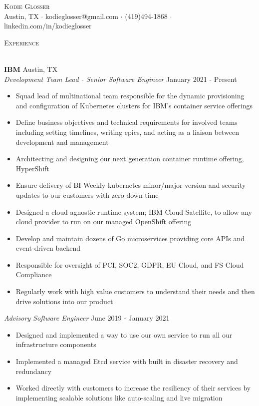 \documentclass[a4paper]{article}
\newcommand{\lineunder} {
    \vspace*{-8pt} \\
    \hspace*{-18pt} \hrulefill \\
}
\newcommand{\header} [1] {
    {\hspace*{-18pt}\vspace*{6pt} \textsc{#1}}
    \vspace*{-6pt} \lineunder
}
\begin{document}
\vspace*{-40pt}



\vspace*{-10pt}
\begin{center}
	{\Huge \scshape {Kodie Glosser}}\\
	Austin, TX $\cdot$ kodieglosser@gmail.com $\cdot$ (419)494-1868 $\cdot$ linkedin.com/in/kodieglosser\\
\end{center}

\header{Experience}
\vspace{1mm}

\textbf{IBM} \hfill Austin, TX\\
\textit{Development Team Lead - Senior Software Engineer} \hfill January 2021 - Present\\
\vspace{-1mm}
\begin{itemize} \itemsep 1pt
	\item Squad lead of multinational team responsible for the dynamic provisioning and configuration of Kubernetes clusters for IBM’s container service offerings
	\item Define business objectives and technical requirements for involved teams including setting timelines, writing epics, and acting as a liaison between development and management
	\item Architecting and designing our next generation container runtime offering, HyperShift
	\item Ensure delivery of BI-Weekly kubernetes minor/major version and security updates to our customers with zero down time
	\item Designed a cloud agnostic runtime system; IBM Cloud Satellite, to allow any cloud provider to run on our managed OpenShift offering
	\item Develop and maintain dozens of Go microservices providing core APIs and event-driven backend
	\item Responsible for oversight of PCI, SOC2, GDPR, EU Cloud, and FS Cloud Compliance
	\item Regularly work with high value customers to understand their needs and then drive solutions into our product
\end{itemize}
\textit{Advisory Software Engineer} \hfill June 2019 - January 2021\\
\vspace{-1mm}
\begin{itemize} \itemsep 1pt
	\item Designed and implemented a way to use our own service to run all our infrastructure components
	\item Implemented a managed Etcd service with built in disaster recovery and redundancy
	\item Worked directly with customers to increase the resiliency of their services by implementing scalable solutions like auto-scaling and live migration
\end{itemize}
\end{document}
